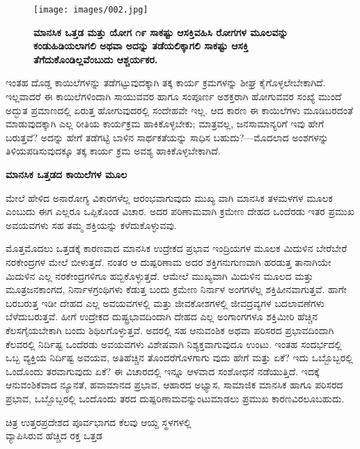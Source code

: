 \begin{figure}
\texttt{[image: images/002.jpg]}
\caption{\textbf{ಮಾನಸಿಕ ಒತ್ತಡ ಮತ್ತು ಯೋಗ ೧೯ ಸಾಕಷ್ಟು ಆಸಕ್ತಿವಹಿಸಿ ರೋಗಗಳ ಮೂಲವನ್ನು ಕಂಡುಹಿಡಿಯಲಾಗಲಿ ಅಥವಾ ಅದನ್ನು ತಡೆಯಲಿಕ್ಕಾಗಲಿ ಸಾಕಷ್ಟು ಆಸಕ್ತಿ ತೆಗೆದುಕೊಂಡಿಲ್ಲವೆಂಬುದು ಆಶ್ಚರ್ಯಕರ.} }
\end{figure}

ಇಂತಹ ದೊಡ್ಡ ಕಾಯಿಲೆಗಳನ್ನು ತಡೆಗಟ್ಟುವುದಕ್ಕಾಗಿ ತಕ್ಕ ಕಾರ್ಯ ಕ್ರಮಗಳನ್ನು ಶೀಘ್ರ ಕೈಗೊಳ್ಳಲೇಬೇಕಾಗಿದೆ. ಇಲ್ಲವಾದರೆ ಈ ಕಾಯಿಲೆಗಳಿಂದಾಗಿ ಸಾಯುವವರ ಹಾಗೂ ಸಂಪೂರ್ಣ ಅಶಕ್ತರಾಗಿ ಹೋಗುವವರ ಸಂಖ್ಯೆ ಮುಂದೆ ಅದ್ಭುತ ಪ್ರಮಾಣದಲ್ಲಿ ಏರುತ್ತ ಹೋಗುವುದರಲ್ಲಿ ಸಂದೇಹವೇ ಇಲ್ಲ. ಆದ ಕಾರಣ ಈ ಕಾಯಿಲೆಗಳು ಮೂಡಿಬರದಂತೆ ಮಾಡುವುದಕ್ಕಾಗಿ ಎಲ್ಲ ರೀತಿಯ ಕಾರ್ಯಕ್ರಮ ಹಾಕಿಕೊಳ್ಳಬೇಕು; ಮಾತ್ರವಲ್ಲ, ಜನಸಾಮಾನ್ಯರಿಗೆ ಇವು ಹೇಗೆ ಬರುತ್ತವೆ? ಅದನ್ನು ಹೇಗೆ ತಡೆಗಟ್ಟಿ ಬಾಳಿನ ಸಾರ್ಥಕತೆಯನ್ನು ಸಾಧಿಸ ಬಹುದು?—ಮೊದಲಾದ ಅಂಶಗಳನ್ನು ತಿಳಿಯಪಡಿಸುವುದಕ್ಕೂ ತಕ್ಕ ಕಾರ್ಯ ಕ್ರಮ ಅವಶ್ಯ ಹಾಕಿಕೊಳ್ಳಬೇಕಾಗಿದೆ.

\textbf{ಮಾನಸಿಕ ಒತ್ತಡದ ಕಾಯಿಲೆಗಳ ಮೂಲ}

ಮೇಲೆ ಹೇಳಿದ ಅನಾರೋಗ್ಯ ವಿಕಾರಗಳೆಲ್ಲ ಆರಂಭವಾಗುವುದು ಮುಖ್ಯ ವಾಗಿ ಮಾನಸಿಕ ತಳಮಳಗಳ ಮೂಲಕ ಎಂಬುದು ಈಗ ಎಲ್ಲರೂ ಒಪ್ಪಿಕೊಂಡ ವಿಚಾರ. ಅದರ ಪರಿಣಾಮವಾಗಿ ಕ್ರಮೇಣ ದೇಹದ ಒಂದೆರಡು ಇತರ ಪ್ರಮುಖ ಅವಯವಗಳು ಸಹ ತಮ್ಮ ಶಕ್ತಿಯನ್ನು ಕಳೆದುಕೊಳ್ಳುವವು.

ಮೊತ್ತಮೊದಲು ಒತ್ತಡಕ್ಕೆ ಕಾರಣವಾದ ಮಾನಸಿಕ ಉದ್ರೇಕದ ಪ್ರಭಾವ ಇಂದ್ರಿಯಗಳ ಮೂಲಕ ಮಿದುಳಿನ ಬೇರೆಬೇರೆ ನರಕೇಂದ್ರಗಳ ಮೇಲೆ ಬೀಳುತ್ತದೆ. ನಂತರ ಆ ದುಷ್ಪರಿಣಾಮ ಅದರ ಶಕ್ತಿಗನುಗುಣವಾಗಿ ಹರಡುತ್ತ ತಾನಾಗಿಯೇ ಮಿದುಳಿನ ಎಲ್ಲ ನರಕೇಂದ್ರಗಳಿಗೂ ಹಬ್ಬಿಕೊಳ್ಳುತ್ತದೆ. ಆಮೇಲೆ ಮುಖ್ಯವಾಗಿ ಮಿದುಳಿನ ಮೂಲದ ಮತ್ತು ಮೂತ್ರಜನಕಾಂಗದ, ನಿರ್ನಾಳಗ್ರಂಥಿಗಳು  ಕೆಡುತ್ತ ಬಂದು ಕ್ರಮೇಣ ನಿರ್ನಾಳ ಅಂಗಗಳೆಲ್ಲ  ಶಕ್ತಿಹೀನವಾಗುತ್ತವೆ. ಹಾಗೇ ಬರಬರುತ್ತ ಇಡೀ ದೇಹದ ಎಲ್ಲ ಅವಯವಗಳಲ್ಲಿ ಮತ್ತು ಜೀವಕೋಶಗಳಲ್ಲಿ ಜೀವದ್ರವ್ಯಗಳ ಬದಲಾವಣೆಗಳು  ಬೆಳೆದುಬರುತ್ತವೆ. ಹೀಗೆ ಉದ್ರೇಕದ ದುಷ್ಟ್ರಭಾವದಿಂದಾಗಿ ದೇಹದ ಎಲ್ಲ ಅಂಗಾಂಗಗಳೂ ಶಕ್ತಿಮೀರಿ ಹೆಚ್ಚಿನ ಕೆಲಸಗೈಯಬೇಕಾಗಿ ಬಂದು ಶಿಥಿಲಗೊಳ್ಳುತ್ತವೆ. ಅದರಲ್ಲಿ ಸಹ ಆನುವಂಶಿಕ ಅಥವಾ ಪರಿಸರದ ಪ್ರಭಾವದಿಂದಾಗಿ ಕೆಲವರಲ್ಲಿ ನಿರ್ದಿಷ್ಟ ಒಂದೆರಡು ಅವಯವಗಳು ವಿಶೇಷವಾಗಿ ನಿಶ್ಯಕ್ತವಾಗುವುದೂ ಉಂಟು. ಇಂತಹ ಸಂದರ್ಭದಲ್ಲಿ ಒಬ್ಬ ವ್ಯಕ್ತಿಯ ನಿರ್ದಿಷ್ಟ ಅವಯವ, ಅತಿಹೆಚ್ಚಿನ ತೊಂದರೆಗೊಳಗಾಗು ವುದು ಹೇಗೆ ಮತ್ತು ಏಕೆ? ಇದು ಒಬ್ಬೊಬ್ಬರಲ್ಲಿ ಒಂದೊಂದು ತರವಾಗುವುದು ಏಕೆ? ಈ ವಿಚಾರದಲ್ಲಿ ಇನ್ನೂ ಆಳವಾದ ಸಂಶೋಧನೆ ನಡೆಯುತ್ತಿದೆ. ಇದಕ್ಕೆ ಆನುವಂಶಿಕವಾದ ನ್ಯೂನತೆ, ಹವಾಮಾನದ ಪ್ರಭಾವ, ಆಹಾರದ ಅಭ್ಯಾಸ, ಸಾಮಾಜಿಕ ಮಾನಸಿಕ ಹಾಗೂ ಪರಿಸರದ ಪ್ರಭಾವ, ಒಬ್ಬೊಬ್ಬರಲ್ಲಿ ಒಂದೊಂದು ತರದ ದುಷ್ಪರಿಣಾಮವನ್ನುಂಟುಮಾಡಲು ಪ್ರಮುಖ ಕಾರಣವಿರಲೂಬಹುದು.

\begin{center}
ಚಿತ್ರ  ಉತ್ತರಪ್ರದೇಶದ ಪೂರ್ವಭಾಗದ ಕೆಲವು ಆಯ್ದ ಸ್ಥಳಗಳಲ್ಲಿ\\ವ್ಯಾಪಿಸಿರುವ ಹೆಚ್ಚಿದ ರಕ್ತ ಒತ್ತಡ 
\end{center}


